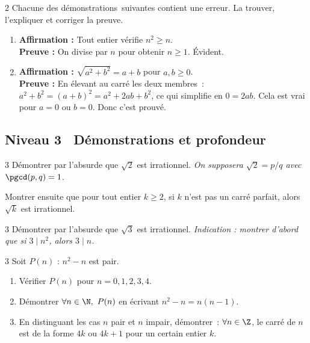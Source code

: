 \begin{exo}{2}
Chacune des \og d\'emonstrations\fg\ suivantes contient une erreur.
La trouver, l'expliquer et corriger la preuve.
\begin{enumerate}
  \item \textbf{Affirmation :} Tout entier v\'erifie $n^2 \geq n$.\\
        \textbf{Preuve :} On divise par $n$ pour obtenir $n \geq 1$. \'Evident.
  \item \textbf{Affirmation :} $\sqrt{a^2+b^2} = a + b$ pour $a,b \geq 0$.\\
        \textbf{Preuve :} En \'elevant au carr\'e les deux membres~:
        $a^2+b^2 = (a+b)^2 = a^2+2ab+b^2$, ce qui simplifie en $0=2ab$.
        Cela est vrai pour $a=0$ ou $b=0$. Donc c'est prouv\'e.
\end{enumerate}
\end{exo}

\subsection*{\quad Niveau 3 \textemdash\ D\'emonstrations et profondeur}

\begin{exo}{3}
D\'emontrer par l'absurde que $\sqrt{2}$
est irrationnel.
\emph{On supposera $\sqrt{2} = p/q$ avec $\pgcd(p,q)=1$.}

Montrer ensuite que pour tout entier $k\geq 2$, si $k$ n'est pas un
carr\'e parfait, alors $\sqrt{k}$ est irrationnel.
\end{exo}

\begin{exo}{3}
D\'emontrer par l'absurde que $\sqrt{3}$ est irrationnel.
\emph{Indication : montrer d'abord que si $3 \mid n^2$, alors $3 \mid n$.}
\end{exo}

\begin{exo}{3}
Soit $P(n)$ : \og $n^2 - n$ est pair.\fg
\begin{enumerate}
  \item V\'erifier $P(n)$ pour $n = 0, 1, 2, 3, 4$.
  \item D\'emontrer $\forall n \in \N,\ P(n)$ en \'ecrivant $n^2-n = n(n-1)$.
  \item En distinguant les cas $n$ pair et $n$ impair, d\'emontrer~:
        $\forall n \in \Z$, le carr\'e de $n$ est de la forme
        $4k$ ou $4k+1$ pour un certain entier $k$.
\end{enumerate}
\end{exo}

